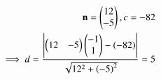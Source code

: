 \begin{align}
		\mathbf{n} = \begin{pmatrix}
	  12 \\
	  -5 
	  \end{pmatrix} ,   c = -82 
	  \\
	  \implies 
	d 
	= \frac{\left\vert  \begin{pmatrix}12 & -5 \end{pmatrix}\begin{pmatrix}-1 \\ 1\end{pmatrix}-\left(-82\right) \right\vert}{\sqrt{12^2+\left(-5\right)^2}} 	
	= 5
\end{align}

